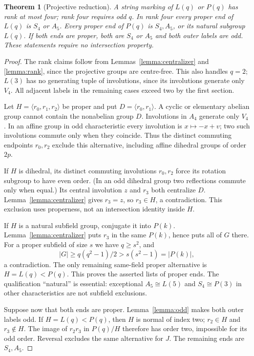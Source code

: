 \documentclass[11pt,a4paper]{article}
\newtheorem{theorem}{Theorem}
\begin{document}
\begin{theorem}[Projective reduction]\label{thm:projective}
A string marking of $L(q)$ or $P(q)$ has rank at most four; rank four
requires odd $q$. In rank four every proper end of $L(q)$ is $S_4$ or
$A_5$. Every proper end of $P(q)$ is $S_4,A_5$, or its natural subgroup
$L(q)$. If both ends are proper, both are $S_4$ or $A_5$ and both outer
labels are odd. These statements require no intersection property.
\end{theorem}
\begin{proof}
The rank claims follow from Lemmas~\ref{lemma:centralizer} and
\ref{lemma:rank}, since the projective groups are centre-free. This also
handles $q=2$; $L(3)$ has no generating tuple of involutions, since its
involutions generate only $V_4$. All adjacent labels in the remaining
cases exceed two by the first section.

Let $H=\langle r_0,r_1,r_2\rangle$ be proper and put
$D=\langle r_0,r_1\rangle$. A cyclic or elementary abelian group cannot
contain the nonabelian group $D$. Involutions in $A_4$ generate only
$V_4$. In an affine group in odd characteristic every involution is
$x\mapsto-x+v$; two such involutions commute only when they coincide.
Thus the distinct commuting endpoints $r_0,r_2$ exclude this alternative,
including affine dihedral groups of order $2p$.

If $H$ is dihedral, its distinct commuting involutions $r_0,r_2$ force
its rotation subgroup to have even order. (In an odd dihedral group two
reflections commute only when equal.) Its central involution $z$ and
$r_3$ both centralize $D$. Lemma~\ref{lemma:centralizer} gives $r_3=z$,
so $r_3\in H$, a contradiction. This exclusion uses properness, not an
intersection identity inside $H$.

If $H$ is a natural subfield group, conjugate it into $P(k)$.
Lemma~\ref{lemma:centralizer} puts $r_3$ in the same $P(k)$, hence puts
all of $G$ there. For a proper subfield of size $s$ we have $q\ge s^2$,
and
\[
 |G|\ge q(q^2-1)/2>s(s^2-1)=|P(k)|,
\]
a contradiction. The only remaining same-field proper alternative is
$H=L(q)<P(q)$. This proves the asserted lists of proper ends. The
qualification ``natural'' is essential: exceptional $A_5\cong L(5)$
and $S_4\cong P(3)$ in other characteristics are not subfield exclusions.

Suppose now that both ends are proper. Lemma~\ref{lemma:odd} makes both
outer labels odd. If $H=L(q)<P(q)$, then $H$ is normal of index two;
$r_2\in H$ and $r_3\notin H$. The image of $r_2r_3$ in $P(q)/H$
therefore has order two, impossible for its odd order. Reversal excludes
the same alternative for $J$. The remaining ends are $S_4,A_5$.
\end{proof}
\end{document}
